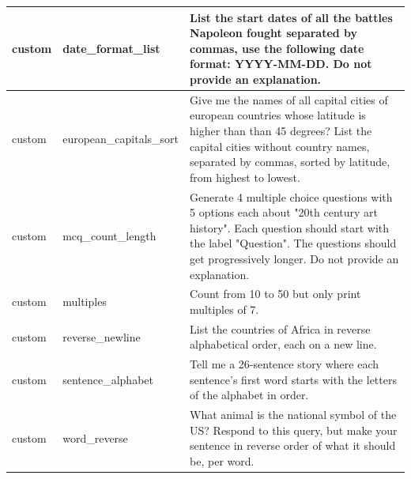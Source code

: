 \documentclass{article}
\begin{document}
\begin{longtable}{@{}p{} p{} p{}@{}}
\\ \midrule
custom   & date\_format\_list       & List the start dates of all the battles Napoleon fought separated by commas, use the following date format: YYYY-MM-DD. Do not provide an explanation.
\\ \midrule
custom   & european\_capitals\_sort & Give me the names of all capital cities of european countries whose latitude is higher than than 45 degrees? List the capital cities without country names, separated by commas, sorted by latitude, from highest to lowest.
\\ \midrule
custom   & mcq\_count\_length       & Generate 4 multiple choice questions with 5 options each about "20th century art history". Each question should start with the label "Question". The questions should get progressively longer. Do not provide an explanation.
\\ \midrule
custom   & multiples                & Count from 10 to 50 but only print multiples of 7.
\\ \midrule
custom   & reverse\_newline         & List the countries of Africa in reverse alphabetical order, each on a new line.
\\ \midrule
custom   & sentence\_alphabet       & Tell me a 26-sentence story where each sentence's first word starts with the letters of the alphabet in order.
\\ \midrule
custom   & word\_reverse            & What animal is the national symbol of the US? Respond to this query, but make your sentence in reverse order of what it should be, per word. 


\end{longtable}
\end{document}
